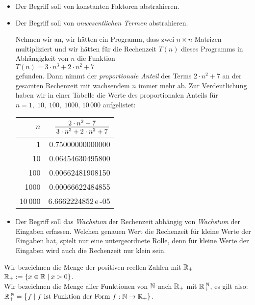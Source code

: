 \begin{itemize}
\item Der Begriff soll von konstanten Faktoren abstrahieren.
\item Der Begriff soll von \emph{unwesentlichen Termen} abstrahieren.

      Nehmen wir an, wir h\"atten ein Programm, dass zwei $n \times n$ Matrizen
      multipliziert und wir h\"atten f\"ur die Rechenzeit $T(n)$ dieses Programms in Abh\"angigkeit von
      $n$ die Funktion \\[0.1cm]
      \hspace*{1.3cm} $T(n) = 3 \cdot n^3 + 2 \cdot n^2 + 7$ \\[0.1cm]
      gefunden.  Dann nimmt der \emph{proportionale Anteil} des Terms $2\cdot n^2 + 7$ an der
      gesamten Rechenzeit mit wachsendem $n$ immer mehr ab.  Zur Verdeutlichung haben wir
      in einer Tabelle die Werte des proportionalen Anteils f\"ur 
      $n = 1,\; 10,\; 100,\; 1000,\, 10\,000$ aufgelistet: \\[0.3cm]
      \hspace*{1.3cm} 
      \begin{tabular}{|r|r|}
        \hline
        $n$  & \rule{0pt}{16pt} $\bruch{2 \cdot n^2 + 7}{3 \cdot n^3 + 2 \cdot n^2 + 7}$ \\[0.3cm]
        \hline
        \hline
        1       &  0.75000000000000  \\
        10      &  0.06454630495800  \\
        100     &  0.00662481908150  \\
        1000    &  0.00066622484855  \\
        10\,000 &  6.6662224852\,e\,-05  \\
       \hline
      \end{tabular}
\item Der Begriff soll das \emph{Wachstum} der Rechenzeit abh\"angig von \emph{Wachstum} der
      Eingaben erfassen. Welchen genauen Wert die Rechenzeit f\"ur kleine Werte der Eingaben
      hat, spielt nur eine untergeordnete Rolle, denn f\"ur kleine Werte der Eingaben 
      wird auch die Rechenzeit nur klein sein.
\end{itemize}
Wir bezeichnen die Menge der positiven reellen Zahlen mit ${\mathbb R}_+$ \\[0.1cm]
\hspace*{1.3cm} ${\mathbb R}_+ := \{ x \in {\mathbb R} \mid x > 0 \}$. \\[0.1cm]
Wir bezeichnen die Menge aller Funktionen von ${\mathbb N}$ nach
 ${\mathbb R}_+$ mit ${\mathbb R}_+^{\;{\mathbb N}}$, es gilt also: \\[0.1cm]
\hspace*{1.3cm} 
${\mathbb R}_+^{\;{\mathbb N}} = \bigl\{ f \mid \mbox{$f$ ist Funktion der Form $f: {\mathbb N} \rightarrow {\mathbb R}_+$} \}$.

